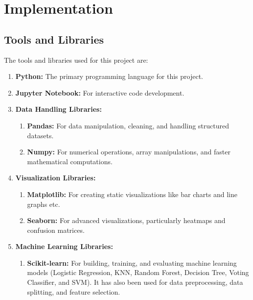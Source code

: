 \documentclass[12pt]{report}
\begin{document}
\chapter{Implementation}
\section{Tools and Libraries}
The tools and libraries used for this project are:
\vspace{-1.25em}
\begin{enumerate}
    \setlength\itemsep{-1.05em}
    \item{\textbf{Python:}} The primary programming language for this project.
    \item{\textbf{Jupyter Notebook:}} For interactive code development.
    \item{\textbf{Data Handling Libraries:}}
        \vspace{-1.5em}
        \begin{enumerate}
            \setlength\itemsep{-1.5em}
            \item{\textbf{Pandas:}} For data manipulation, cleaning, and handling structured datasets.
            \item{\textbf{Numpy:}} For numerical operations, array manipulations, and faster mathematical computations.
        \end{enumerate}
    \item{\textbf{Visualization Libraries: }}
        \vspace{-1.5em}
        \begin{enumerate}
            \setlength\itemsep{-1.5em}
            \item{\textbf{Matplotlib:}} For creating static visualizations like bar charts and line graphs etc.
            \item{\textbf{Seaborn:}} For advanced visualizations, particularly heatmaps and confusion matrices.
        \end{enumerate}
    \item{\textbf{Machine Learning Libraries: }}
        \vspace{-1.5em}
        \begin{enumerate}
            \setlength\itemsep{-1.5em}
            \item{\textbf{Scikit-learn:}} For building, training, and evaluating machine learning models (Logistic Regression, KNN, Random Forest, Decision Tree, Voting Classifier, and SVM). It has also been used for data preprocessing, data splitting, and feature selection.

\end{enumerate}
\end{enumerate}
\end{document}
